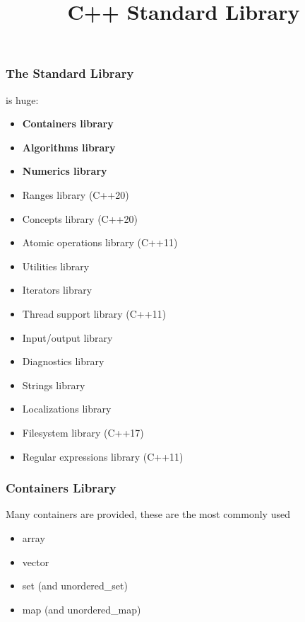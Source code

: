 \documentclass{beamer}
\title{C++ Standard Library}
\begin{document}
\begin{frame}
  \titlepage
\end{frame}

\begin{frame}
  \frametitle{The Standard Library}
  is huge:
  \begin{itemize}
    \item {\bf Containers library}
    \item {\bf Algorithms library}
    \item {\bf Numerics library}
    \item Ranges library (C++20)
    \item Concepts library (C++20)
    \item Atomic operations library (C++11)
    \item Utilities library
    \item Iterators library
    \item Thread support library (C++11)
    \item Input/output library
    \item Diagnostics library
    \item Strings library
    \item Localizations library
    \item Filesystem library (C++17)
    \item Regular expressions library (C++11)
  \end{itemize}
\end{frame}

\begin{frame}
  \frametitle{Containers Library}
  Many containers are provided, these are the most commonly used
  \begin{itemize}
    \item array
    \item vector
    \item set (and unordered\_set)
    \item map (and unordered\_map)
  \end{itemize}
\end{frame}
\end{document}
